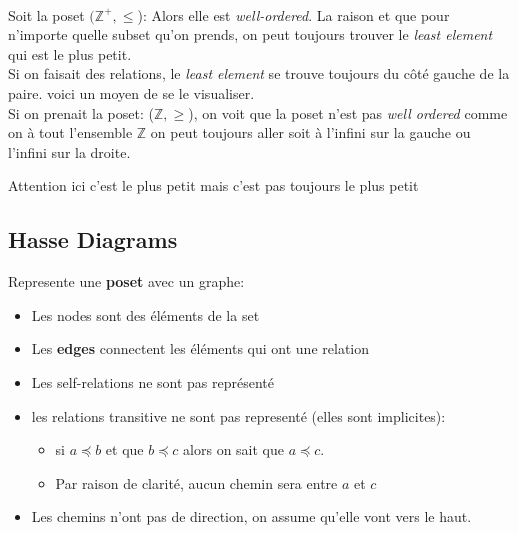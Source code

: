 \begin{exemple}
\\

Soit la poset $(\mathbb{Z}^+, \leq$): Alors elle est \textit{well-ordered}. La raison et que pour n'importe quelle subset qu'on prends, on peut toujours trouver le \textit{least element} qui est le plus petit.
\\
Si on faisait des relations, le \textit{least element} se trouve toujours du côté gauche de la paire. voici un moyen de se le visualiser.
\\
Si on prenait la poset: ($\mathbb{Z}, \geq$), on voit que la poset n'est pas \textit{well ordered} comme on à tout l'ensemble $\mathbb{Z}$ on peut toujours aller soit à l'infini sur la gauche ou l'infini sur la droite.
\end{exemple}
\begin{framedremark}
    Attention ici c'est le plus petit mais c'est pas toujours le plus petit
\end{framedremark}

\subsection{Hasse Diagrams}
Represente une \textbf{poset} avec un graphe:
\begin{itemize}
    \item Les nodes sont des éléments de la set
    \item Les \textbf{edges} connectent les éléments qui ont une relation
    \item Les self-relations ne sont pas représenté
    \item les relations transitive ne sont pas representé (elles sont implicites):
    \begin{itemize}
        \item si $a \preceq b$ et que $b \preceq c$ alors on sait que $a \preceq c$.
        \item Par raison de clarité, aucun chemin sera entre $a$ et $c$
    \end{itemize}
    \item Les chemins n'ont pas de direction, on assume qu'elle vont vers le haut.
\end{itemize}
\\

